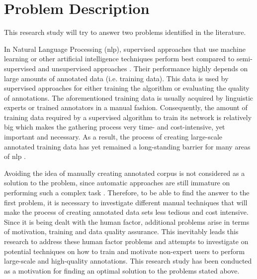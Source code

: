 \section{Problem Description}
This research study will try to answer two problems identified in the literature.

In Natural Language Processing (\ac{nlp}), supervised approaches that use machine learning or other artificial intelligence techniques perform best compared to semi-supervised and unsupervised approaches \cite{30}. Their performance highly depends on large amounts of annotated data (i.e. training data). This data is used by supervised approaches for either training the algorithm or evaluating the quality of annotations. The aforementioned training data is usually acquired by linguistic experts or trained annotators in a manual fashion. Consequently, the amount of training data required by a supervised algorithm to train its network is relatively big which makes the gathering process very time- and cost-intensive, yet important and necessary. As a result, the process of creating large-scale annotated training data has yet remained a long-standing barrier for many areas of \ac{nlp} \cite{41}.

Avoiding the idea of manually creating annotated corpus is not considered as a solution to the problem, since automatic approaches are still immature on performing such a complex task \cite{30}. Therefore, to be able to find the answer to the first problem, it is necessary to investigate different manual techniques that will make the process of creating annotated data sets less tedious and cost intensive. Since it is being dealt with the human factor, additional problems arise in terms of motivation, training and data quality assurance. This inevitably leads this research to address these human factor problems and attempts to investigate on potential techniques on how to train and motivate non-expert users to perform large-scale and high-quality annotations. This research study has been conducted as a motivation for finding an optimal solution to the problems stated above.